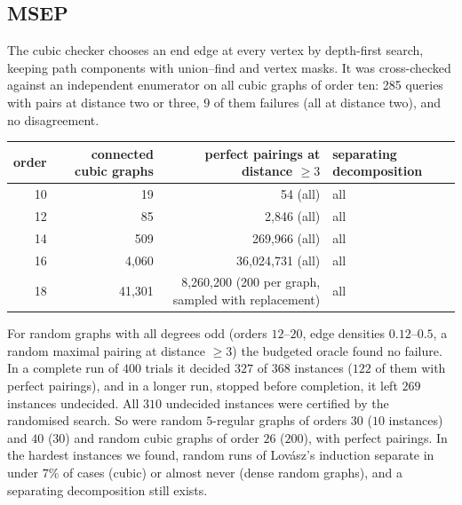 \documentclass[11pt]{amsart}
\theoremstyle{definition}
\begin{document}
\subsection*{MSEP}
The cubic checker chooses an end edge at every vertex by depth-first search, keeping path components
with union--find and vertex masks. It was cross-checked against an independent enumerator on all cubic
graphs of order ten: 285 queries with pairs at distance two or three, $9$ of them failures (all at distance
two), and no disagreement.
\begin{center}
\begin{tabular}{rrrl}
\toprule
order & connected cubic graphs & perfect pairings at distance $\ge3$ & separating decomposition\\
\midrule
10 & 19 & 54 (all) & all\\
12 & 85 & 2{,}846 (all) & all\\
14 & 509 & 269{,}966 (all) & all\\
16 & 4{,}060 & 36{,}024{,}731 (all) & all\\
18 & 41{,}301 & 8{,}260{,}200 (200 per graph, sampled with replacement) & all\\
\bottomrule
\end{tabular}
\end{center}
For random graphs with all degrees odd (orders $12$--$20$, edge densities $0.12$--$0.5$, a random maximal
pairing at distance $\ge3$) the budgeted oracle found no failure. In a complete run of $400$ trials it
decided $327$ of $368$ instances ($122$ of them with perfect pairings), and in a longer run, stopped before
completion, it left $269$ instances undecided. All $310$ undecided instances were certified by the
randomised search. So were random $5$-regular graphs of
orders $30$ ($10$ instances) and $40$ ($30$) and random cubic graphs of order $26$ ($200$), with perfect
pairings. In the hardest instances we found, random runs of Lov\'asz's induction separate in under $7\%$
of cases (cubic) or almost never (dense random graphs), and a separating decomposition still exists.
\end{document}
